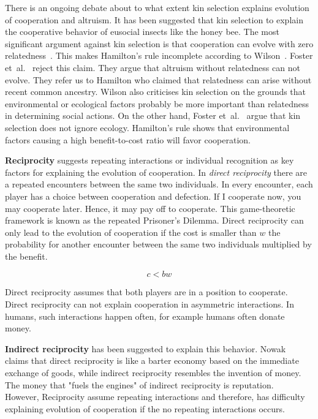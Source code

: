 \documentclass{article}
\begin{document}
There is an ongoing debate about to what extent kin selection explains evolution of cooperation and altruism.
It has been suggested that kin selection to explain the cooperative behavior of eusocial insects like the honey bee.
The most significant argument against kin selection is that cooperation can evolve with zero relatedness~\cite{wilson2005kin}. This makes Hamilton's rule incomplete according to Wilson~\cite{wilson2005kin}. Foster et~al.~\cite{foster2006kin} reject this claim. They argue that altruism without relatedness can not evolve. They refer us to Hamilton who claimed that relatedness can arise without recent common ancestry. 
Wilson also criticises kin selection on the grounds that environmental or ecological factors probably be more important than relatedness in determining social actions. On the other hand, Foster et~al.~\cite{foster2006kin} argue that kin selection does not ignore ecology. Hamilton’s rule shows
that environmental factors causing a high benefit-to-cost ratio will favor cooperation.

\textbf{Reciprocity} suggests repeating interactions or individual recognition as key factors for explaining the evolution of cooperation. In \textit{direct reciprocity} there are a repeated encounters between the same two individuals. In every encounter, each player has a choice between cooperation and defection. If I cooperate now, you may cooperate later. Hence, it may pay off to cooperate.
This game-theoretic framework is known as the repeated Prisoner's Dilemma. 
Direct reciprocity can only lead to the evolution of cooperation if the cost is smaller than $w$ the probability for another encounter between the same two individuals multiplied by the benefit. 

\begin{equation} \label{eq:reciprocity}
c<bw
\end{equation}

Direct reciprocity assumes that both players are in a position to cooperate. Direct reciprocity can not explain cooperation in asymmetric interactions. In humans, such interactions happen often, for example humans often donate money. 

\textbf{Indirect reciprocity} has been suggested to explain this behavior. 
Nowak~\cite{nowak2006five} claims that direct reciprocity is like a barter economy based on the immediate exchange of goods, while indirect reciprocity resembles the invention of money. The money that "fuels the engines" of indirect reciprocity is reputation. 
\\However, Reciprocity assume repeating interactions and therefore, has difficulty explaining evolution of cooperation if the no repeating interactions occurs. 
\end{document}
